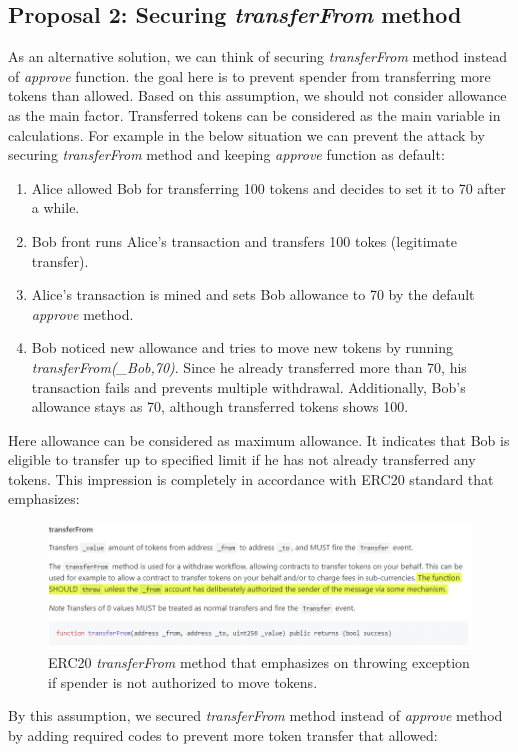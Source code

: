 \subsection{Proposal 2: Securing \textit{transferFrom} method}
As an alternative solution, we can think of securing \textit{transferFrom} method instead of \textit{approve} function. the goal here is to prevent spender from transferring more tokens than allowed. Based on this assumption, we should not consider allowance as the main factor. Transferred tokens can be considered as the main variable in calculations. For example in the below situation we can prevent the attack by securing \textit{transferFrom} method and keeping \textit{approve} function as default:
\begin{enumerate}
	\item Alice allowed Bob for transferring 100 tokens and decides to set it to 70 after a while.
	\item Bob front runs Alice’s transaction and transfers 100 tokes (legitimate transfer).
	\item Alice’s transaction is mined and sets Bob allowance to 70 by the default \textit{approve} method.
	\item Bob noticed new allowance and tries to move new tokens by running \textit{transferFrom(\_Bob,70)}. Since he already transferred more than 70, his transaction fails and prevents multiple withdrawal. Additionally, Bob’s allowance stays as 70, although transferred tokens shows 100.
\end{enumerate}
Here allowance can be considered as maximum allowance. It indicates that Bob is eligible to transfer up to specified limit if he has not already transferred any tokens. This impression is completely in accordance with ERC20 standard that emphasizes:
\begin{figure}[t]
	\centering
	\includegraphics[width=1.0\linewidth]{figures/multiple_withdrawal_30.png}
	\caption{ERC20 \textit{transferFrom} method that emphasizes on throwing exception if spender is not authorized to move tokens.}
\end{figure}
\noindent By this assumption, we secured \textit{transferFrom} method instead of \textit{approve} method by adding required codes to prevent more token transfer that allowed:
